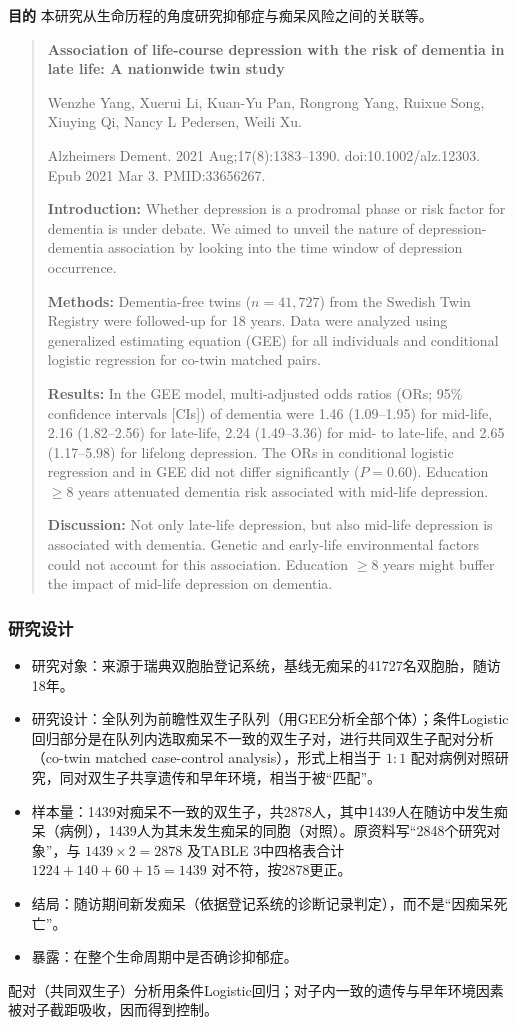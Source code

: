 \textbf{目的} 本研究从生命历程的角度研究抑郁症与痴呆风险之间的关联等。
\begin{quote}\small
\textbf{Association of life-course depression with the risk of dementia in late life: A nationwide twin study}

Wenzhe Yang, Xuerui Li, Kuan-Yu Pan, Rongrong Yang, Ruixue Song, Xiuying Qi, Nancy L Pedersen, Weili Xu.

Alzheimers Dement. 2021 Aug;17(8):1383--1390. doi:10.1002/alz.12303. Epub 2021 Mar 3. PMID:33656267.

\textbf{Introduction:} Whether depression is a prodromal phase or risk factor for dementia is under debate. We aimed to unveil the nature of depression-dementia association by looking into the time window of depression occurrence.

\textbf{Methods:} Dementia-free twins ($n=41,727$) from the Swedish Twin Registry were followed-up for 18 years. Data were analyzed using generalized estimating equation (GEE) for all individuals and conditional logistic regression for co-twin matched pairs.

\textbf{Results:} In the GEE model, multi-adjusted odds ratios (ORs; 95\% confidence intervals [CIs]) of dementia were 1.46 (1.09--1.95) for mid-life, 2.16 (1.82--2.56) for late-life, 2.24 (1.49--3.36) for mid- to late-life, and 2.65 (1.17--5.98) for lifelong depression. The ORs in conditional logistic regression and in GEE did not differ significantly ($P=0.60$). Education $\ge8$ years attenuated dementia risk associated with mid-life depression.

\textbf{Discussion:} Not only late-life depression, but also mid-life depression is associated with dementia. Genetic and early-life environmental factors could not account for this association. Education $\ge8$ years might buffer the impact of mid-life depression on dementia.
\end{quote}
\subsubsection{研究设计}
\begin{itemize}
\item 研究对象：来源于瑞典双胞胎登记系统，基线无痴呆的41727名双胞胎，随访18年。
\item 研究设计：全队列为前瞻性双生子队列（用GEE分析全部个体）；条件Logistic回归部分是在队列内选取痴呆不一致的双生子对，进行共同双生子配对分析（co-twin matched case-control analysis），形式上相当于 $1:1$ 配对病例对照研究，同对双生子共享遗传和早年环境，相当于被“匹配”。
\item 样本量：1439对痴呆不一致的双生子，共2878人，其中1439人在随访中发生痴呆（病例），1439人为其未发生痴呆的同胞（对照）。原资料写“2848个研究对象”，与 $1439\times2=2878$ 及TABLE 3中四格表合计 $1224+140+60+15=1439$ 对不符，按2878更正。
\item 结局：随访期间新发痴呆（依据登记系统的诊断记录判定），而不是“因痴呆死亡”。
\item 暴露：在整个生命周期中是否确诊抑郁症。
\end{itemize}
\begin{annotation}配对（共同双生子）分析用条件Logistic回归；对子内一致的遗传与早年环境因素被对子截距吸收，因而得到控制。\end{annotation}
